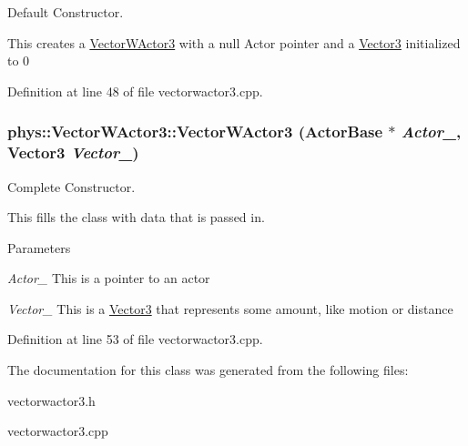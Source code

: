 Default Constructor. 

This creates a \hyperlink{classphys_1_1VectorWActor3}{VectorWActor3} with a null Actor pointer and a \hyperlink{classphys_1_1Vector3}{Vector3} initialized to 0 

Definition at line 48 of file vectorwactor3.cpp.

\hypertarget{classphys_1_1VectorWActor3_aab8024707cc3747d387d329536bb77f4}{
\subsubsection[{VectorWActor3}]{\setlength{\rightskip}{0pt plus 5cm}phys::VectorWActor3::VectorWActor3 ({\bf ActorBase} $\ast$ {\em Actor\_\-}, \/  {\bf Vector3} {\em Vector\_\-})}}
\label{de/ddc/classphys_1_1VectorWActor3_aab8024707cc3747d387d329536bb77f4}


Complete Constructor. 

This fills the class with data that is passed in. 
\begin{DoxyParams}{Parameters}
\item[{\em Actor\_\-}]This is a pointer to an actor \item[{\em Vector\_\-}]This is a \hyperlink{classphys_1_1Vector3}{Vector3} that represents some amount, like motion or distance \end{DoxyParams}


Definition at line 53 of file vectorwactor3.cpp.



The documentation for this class was generated from the following files:\begin{DoxyCompactItemize}
\item 
vectorwactor3.h\item 
vectorwactor3.cpp\end{DoxyCompactItemize}
